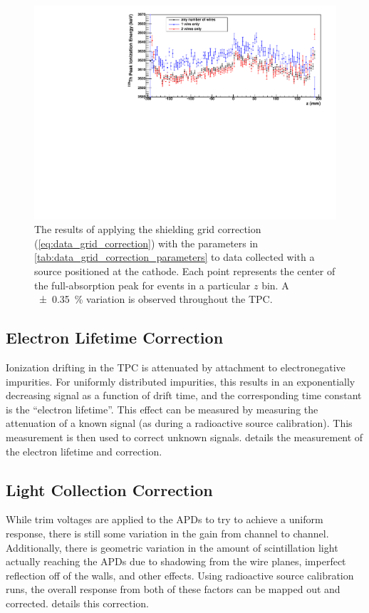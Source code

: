 \documentclass[herrin-thesis.tex]{subfiles}
\begin{document}
\begin{figure}[htbp]
\centering
\includegraphics[width=\textwidth]{./plots/data_grid_correction_applied.pdf}
\caption[The shielding grid correction applied to data]{The results of applying the shielding grid correction (\cref{eq:data_grid_correction}) with the parameters in \cref{tab:data_grid_correction_parameters} to data collected with a  source positioned at the cathode.  Each point represents the center of the full-absorption peak for events in a particular \(z\) bin. A \SI{\pm0.35}{\percent} variation is observed throughout the TPC.}
	\label{fig:data_grid_correction_applied}
\end{figure}

\subsection{Electron Lifetime Correction}
Ionization drifting in the TPC is attenuated by attachment to electronegative impurities. For uniformly distributed impurities, this results in an exponentially decreasing signal as a function of drift time, and the corresponding time constant is the ``electron lifetime''. This effect can be measured by measuring the attenuation of a known signal (as during a radioactive source calibration). This measurement is then used to correct unknown signals.  details the measurement of the electron lifetime and correction.

\subsection{Light Collection Correction}
While trim voltages are applied to the APDs to try to achieve a uniform response, there is still some variation in the gain from channel to channel. Additionally, there is geometric variation in the amount of scintillation light actually reaching the APDs due to shadowing from the wire planes, imperfect reflection off of the walls, and other effects. Using radioactive source calibration runs, the overall response from both of these factors can be mapped out and corrected.  details this correction.
\end{document}
